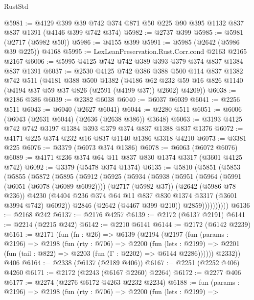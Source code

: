 \begin{lexlean}{RustStd}
\begin{coremodule}
@5981 := @4129
    @399
    @39
    @742
    @374
    @871
    @50
    @225
    @90
    @395
    @1132
    @837
    @837
    @1391
    (@4146 @399 @742 @374)
@5982 := @2737 @399
@5985 := @5981 (@2717 (@5982 @50))
@5986 := @4155 @399
@5991 := @5985 (@2642 (@5986 @39 @225)) @4168
@5995 := LexLeanPreservation.Rust.Corr.cond @2163 @2165 @2167
@6006 := @5995 @4125 @742 @742 @389 @393 @379 @374 @837 @1384 @837 @1391
@6037 := @2530
    @4125
    @742
    @386
    @388
    @500
    @114
    @837
    @1382
    @742
    @511
    (@4181
      @388
      @500
      @1382
      (@4186 @62 @232 @59 @16 @826 @1140 (@4194 @37 @59 @37 @826 (@2591 (@4199 @37)) @2602) @4209))
@6038 := @2186 @386
@6039 := @2382 @6038
@6040 := @6037 @6039
@6041 := @2256 @511
@6043 := @6040 (@2627 @6041)
@6044 := @2280 @511
@6051 := @6006 (@6043 (@2631 @6044) (@2636 (@2638 @386)) @3648)
@6063 := @3193 @4125 @742 @742 @3197 @1384 @393 @379 @374 @837 @1388 @837 @1376
@6072 := @4171 @225 @374 @232 @16 @837 @1140 @1386 @3318 @4210
@6073 := @3381 @225
@6076 := @3379 (@6073 @374 @1386)
@6078 := @6063 (@6072 @6076)
@6089 := @4171 @236 @374 @64 @11 @837 @830 @1374 @3317 (@3601 @4125 @742)
@6092 := @3379 (@5478 @374 @1374)
@6135 := @5810
    (@5851
      (@5853
        (@5855
          (@5872
            (@5895
              (@5912
                (@5925
                  (@5934
                    (@5938
                      (@5951
                        (@5964
                          (@5991 (@6051 (@6078 (@6089 @6092))))
                          (@2717 (@5982 @37))
                          (@2642 (@5986 @78 @236))
                          @4230
                          (@4404 @236 @374 @64 @11 @837 @830 @1374 @3317 (@3601 @3994 @742) @6092))
                        @2846
                        (@2642 (@4467 @399 @210))
                        @2859))))))))))
@6136 := @2168 @242
@6137 := @2176 @4257
@6139 := @2172 (@6137 @2191)
@6141 := @2214 (@2215 @242)
@6142 := @2210 @6141
@6144 := @2172 (@6142 @2239)
@6161 := @2171
    (fun (fn : @26) =>
    @6139
      (@2194
        (@2197
          (fun (params : @2196) =>
          @2198
            (fun (rty : @706) =>
            @2200
              (fun (lets : @2199) =>
              @2201 (fun (tail : @822) => @2203 (fun (Γ : @2202) => @6144 @2286))))))
        @2332))
    @406
@6164 := @2338 (@6137 (@2189 @406))
@6167 := @2251 (@2252 @406) @4260
@6171 := @2172 (@2243 (@6167 @2260) @2264)
@6172 := @2277 @406
@6177 := @2274 (@2276 @6172 @4263 @2232 @2234)
@6188 := fun (params : @2196) =>
  @2198
    (fun (rty : @706) =>
    @2200
      (fun (lets : @2199) =>

\end{coremodule}
\end{lexlean}
